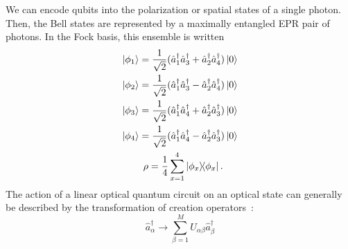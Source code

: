 \documentclass[aps,pra,twocolumn,showpacs,superscriptaddress,floatfix,10pt]{revtex4}
\begin{document}
We can encode qubits into the polarization or spatial states of a single photon. Then, the Bell states are represented by a maximally entangled EPR pair of photons. In the Fock basis, this ensemble is written
\begin{eqnarray}
\label{Bell States Creation Operator 1}
\ket{\phi_1} = \frac{1}{\sqrt{2}} (\hat{a}_1^\dagger \hat{a}_3^\dagger + \hat{a}_2^\dagger \hat{a}_4^\dagger) \ket{0} \\
\label{Bell States Creation Operator 2}
\ket{\phi_2} = \frac{1}{\sqrt{2}} (\hat{a}_1^\dagger \hat{a}_3^\dagger - \hat{a}_2^\dagger \hat{a}_4^\dagger) \ket{0} \\
\label{Bell States Creation Operator 3}
\ket{\phi_3} = \frac{1}{\sqrt{2}} (\hat{a}_1^\dagger \hat{a}_4^\dagger + \hat{a}_2^\dagger \hat{a}_3^\dagger) \ket{0} \\
\label{Bell States Creation Operator 4}
\ket{\phi_4} = \frac{1}{\sqrt{2}} (\hat{a}_1^\dagger \hat{a}_4^\dagger - \hat{a}_2^\dagger \hat{a}_3^\dagger) \ket{0} \\
\label{Bell State Ensemble}
\rho = \frac{1}{4} \sum_{x=1}^{4} \outerproduct{\phi_x}{\phi_x}. \quad  \enspace
\end{eqnarray}
The action of a linear optical quantum circuit on an optical state can generally be described by the transformation of creation operators~\cite{Reck}:
\begin{equation}
\label{LO Creation Operator Transformation}
\hat{a}^\dagger_\alpha \rightarrow \sum_{\beta=1}^{M} U_{\alpha\beta} \hat{a}^\dagger_\beta
\end{equation}
\end{document}
